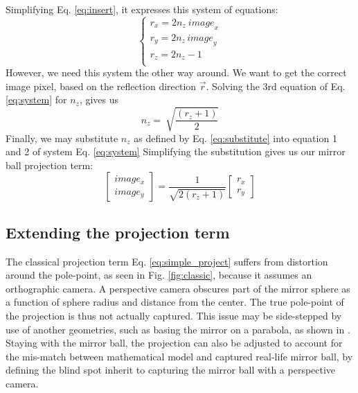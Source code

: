 \documentclass[10pt]{article}
\begin{document}
\begin{multicols}{2}
\begin{equation}
	\end{equation}
	Simplifying Eq. \ref{eq:insert}, it expresses this system of equations:
	\begin{equation}\label{eq:system}
		\left\{\begin{matrix}r_x=2n_z\ {image}_x\\r_y=2n_{z\ }{image}_y\\r_z=2{n_z}-1\ \ \ \ \ \\\end{matrix}\right.
	\end{equation}
	However, we need this system the other way around. We want to get the correct image pixel, based on the reflection direction $\vec{r}$. Solving the 3rd equation of Eq. \ref{eq:system} for $n_z$, gives us
	\begin{equation}\label{eq:substitute}
		n_z=\ \sqrt{\frac{\left(r_z+1\right)}{2}}
	\end{equation}
	Finally, we may substitute $n_z$ as defined by Eq. \ref{eq:substitute} into equation 1 and 2 of system Eq. \ref{eq:system} Simplifying the substitution gives us our mirror ball projection term:
	\begin{equation}\label{eq:simple_project}
		\begin{bmatrix} image_x \\ image_y \end{bmatrix}=\frac{1}{\sqrt{2(r_z+1)}}\begin{bmatrix} r_x \\ r_y \end{bmatrix}
	\end{equation}

	\subsection{Extending the projection term}
	The classical projection term Eq. \ref{eq:simple_project} suffers from distortion around the pole-point, as seen in Fig. \ref{fig:classic}, because it assumes an orthographic camera. A perspective camera obscures part of the mirror sphere as a function of sphere radius and distance from the center. The true pole-point of the projection is thus not actually captured. This issue may be side-stepped by use of another geometries, such as basing the mirror on a parabola, as shown in \cite{hyperbolic}. Staying with the mirror ball, the projection can also be adjusted to account for the mis-match between mathematical model and captured real-life mirror ball, by defining the blind spot inherit to capturing the mirror ball with a perspective camera.


\end{multicols}
\end{document}
